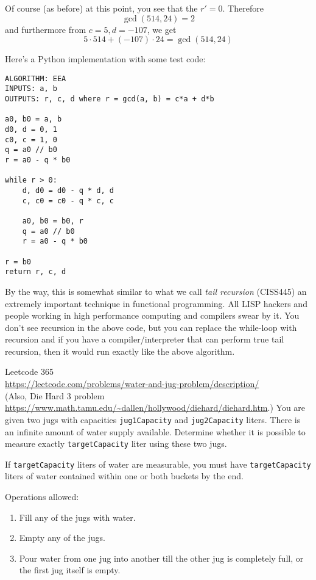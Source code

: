 Of course (as before) at this point, you see that the $r'=0$.
Therefore 
\[
\gcd(514, 24) = 2
\]
and furthermore from $c=5, d=-107$, we get
\[
5 \cdot 514 + (-107) \cdot 24 = \gcd(514, 24) 
\]

Here's a Python implementation with some test code:
\begin{Verbatim}[frame=single, fontsize=\small]
ALGORITHM: EEA
INPUTS: a, b
OUTPUTS: r, c, d where r = gcd(a, b) = c*a + d*b

a0, b0 = a, b
d0, d = 0, 1
c0, c = 1, 0
q = a0 // b0
r = a0 - q * b0

while r > 0:
    d, d0 = d0 - q * d, d    
    c, c0 = c0 - q * c, c

    a0, b0 = b0, r
    q = a0 // b0
    r = a0 - q * b0

r = b0
return r, c, d
\end{Verbatim}

By the way, this is somewhat similar to what we call
\textit{tail recursion} (CISS445)
an extremely important technique in functional programming.
All LISP hackers and people working in high performance computing
and compilers swear by it.
You don't see recursion in the above code, but you can 
replace the while-loop with recursion and if
you have a compiler/interpreter that can perform 
true tail recursion, then it would run exactly like the above algorithm.

\begin{ex}
  Leetcode 365 \\
  \url{https://leetcode.com/problems/water-and-jug-problem/description/} \\
  (Also, Die Hard 3 problem
  \url{https://www.math.tamu.edu/~dallen/hollywood/diehard/diehard.htm}.)
  You are given two jugs with capacities \verb!jug1Capacity! and
  \verb!jug2Capacity! liters.
  There is an infinite amount of water supply available.
  Determine whether it is possible to measure exactly \verb!targetCapacity!
  liter using these two jugs.

  If \verb!targetCapacity! liters of water are measurable,
  you must have \verb!targetCapacity! liters of water contained within one or
  both buckets by the end.

  Operations allowed:
  \begin{enumerate}[nosep]
    \item Fill any of the jugs with water.
    \item Empty any of the jugs.
    \item Pour water from one jug into another till the other jug is completely
      full, or the first jug itself is empty.
  \end{enumerate}
  
\end{ex}

